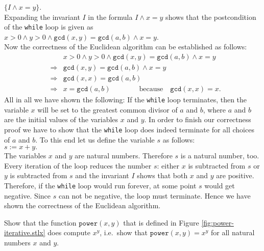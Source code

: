 \hspace*{1.3cm}
$\{ I \wedge x = y \}$. 
\\[0.2cm]
Expanding the invariant $I$ in the formula $I \wedge x = y$ shows that the postcondition of the 
\texttt{while} loop is given as
\\[0.2cm]
\hspace*{1.3cm}
$x > 0 \wedge y > 0 \wedge \texttt{gcd}(x,y) = \texttt{gcd}(a,b) \wedge x = y$.
\\[0.2cm]
Now the correctness of the Euclidean algorithm can be established as follows:
\begin{eqnarray*}
&             &  x > 0 \wedge y > 0 \wedge \texttt{gcd}(x,y) = \texttt{gcd}(a,b) \wedge x = y \\
& \Rightarrow & \texttt{gcd}(x,y) = \texttt{gcd}(a,b) \wedge x = y \\
& \Rightarrow & \texttt{gcd}(x,x) = \texttt{gcd}(a,b)  \\
& \Rightarrow & x = \texttt{gcd}(a,b) \qquad\qquad \mathrm{because} \quad \texttt{gcd}(x,x) = x.
\end{eqnarray*}
All in all we have shown the following: If the \texttt{while} loop terminates, then
the variable $x$ will be set to the greatest common divisor of $a$ and $b$, where $a$ and $b$ are
the initial values of the variables $x$ and $y$.  In order to finish our correctness proof we have
to show that the \texttt{while} loop does indeed terminate for all choices of $a$ and $b$.
To this end let us define the variable $s$ as follows:
\\[0.2cm]
\hspace*{1.3cm}
$ s := x + y. $
\\[0.2cm]
The variables $x$ and $y$ are natural numbers.  Therefore $s$ is a natural number, too.
Every iteration of the loop reduces the number $s$: either $x$ is subtracted from $s$
or $y$ is subtracted from  $s$ and the invariant $I$ shows that both $x$ and $y$ are
positive.  Therefore, if the \texttt{while} loop would run forever, at some point $s$ would get
negative.  Since $s$ can not be negative, the loop must terminate.
Hence we have shown the correctness of the Euclidean  algorithm.
\pagebreak

\exercise
Show that the function $\texttt{power}(x,y)$ that is defined in Figure
\ref{fig:power-iterative.stlx} does compute $x^y$, i.e.~show that $\texttt{power}(x,y) = x^y$ 
for all natural numbers $x$ and $y$.


